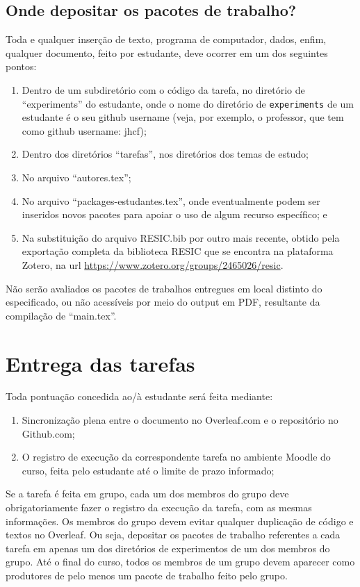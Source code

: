 \subsection{Onde depositar os pacotes de trabalho?}

Toda e qualquer inserção de texto, programa de computador, dados, enfim, qualquer documento, feito por estudante, deve ocorrer em um dos seguintes pontos:
\begin{enumerate}
    \item Dentro de um subdiretório com o código da tarefa, no diretório de ``experiments'' do estudante, onde o nome do diretório de \texttt{experiments} de um estudante é o seu github username (veja, por exemplo, o professor, que tem como github username: jhcf);
    \item Dentro dos diretórios ``tarefas'', nos diretórios dos temas de estudo;
    \item No arquivo ``autores.tex'';
    \item No arquivo ``packages-estudantes.tex'', onde eventualmente podem ser inseridos novos pacotes para apoiar o uso de algum recurso específico; e
    \item Na substituição do arquivo RESIC.bib por outro mais recente, obtido pela exportação completa da biblioteca RESIC que se encontra na plataforma Zotero, na url \url{https://www.zotero.org/groups/2465026/resic}.
\end{enumerate}

Não serão avaliados os pacotes de trabalhos entregues em local distinto do especificado, ou não acessíveis por meio do output em PDF, resultante da compilação de ``main.tex''.

\section{Entrega das tarefas}

Toda pontuação concedida ao/à estudante será feita mediante:
\begin{enumerate}
    \item Sincronização plena entre o documento no Overleaf.com e o repositório no Github.com;
    \item O registro de execução da correspondente tarefa no ambiente Moodle do curso, feita pelo estudante até o limite de prazo informado;
\end{enumerate}

Se a tarefa é feita em grupo, cada um dos membros do grupo deve obrigatoriamente fazer o registro da execução da tarefa, com as mesmas informações. Os membros do grupo devem evitar qualquer duplicação de código e textos no Overleaf. Ou seja, depositar os pacotes de trabalho referentes a cada tarefa em apenas um dos diretórios de experimentos de um dos membros do grupo. Até o final do curso, todos os membros de um grupo devem aparecer como produtores de pelo menos um pacote de trabalho feito pelo grupo.

